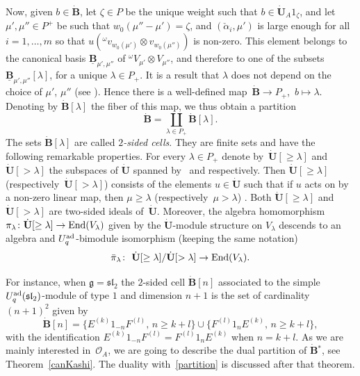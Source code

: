 \documentclass[10pt,a4paper]{amsart}
\numberwithin{equation}{section}
\theoremstyle{definition}
\newcommand{\Oo}{{\mathcal O}}
\newcommand{\ra}{\rightarrow}
\begin{document}
Now, given $b\in \dot{\mathbf{B}}$, let $\zeta\in P$ be the unique weight such that $b \in \dot{\mathbf{U}}_A 1_\zeta$, and let ${\mu', \mu''\in P^+}$ be such that $w_0(\mu''-\mu')=\zeta$, and $(\check{\alpha}_i,\mu')$ is large enough for all $i=1,\dots,m$ so that $u({}^\omega v_{w_0(\mu')}\otimes v_{w_0(\mu'')})$ is non-zero. This element belongs to the canonical basis $\underline{\mathbf{B}}_{\mu',\mu''}$ of ${}^{\omega}V_{\mu'}\otimes V_{\mu''}$, and therefore to one of the subsets $\underline{\mathbf{B}}_{\mu',\mu''}[\lambda]$, for a unique $\lambda\in P_+$. It is a result that $\lambda$ does not depend on the choice of $\mu'$, $\mu''$ (see \cite[Section~29.1.1]{Lusztig}). Hence there is a well-defined map~${\dot{\mathbf{B}}\ra P_+}$,~$b\mapsto \lambda$. Denoting by $\dot{\mathbf{B}} [\lambda]$ the fiber of this map, we thus obtain a partition
\begin{equation}\label{partition} \dot{\mathbf{B}} = \coprod_{\lambda\in P_+}\dot{\mathbf{B}} [\lambda]. \end{equation}
The sets $\dot{\mathbf{B}} [\lambda]$ are called {\it $2$-sided cells}. They are finite sets and have the following remarkable properties. For every $\lambda\in P_+$ denote by~${\dot{\mathbf{U}} [\geq \lambda]}$ and $\dot{\mathbf{U}} [> \lambda]$ the subspaces of $\dot{\mathbf{U}}$ spanned by~ and  respectively. Then $\dot{\mathbf{U}} [\geq \lambda]$ (respectively~${\dot{\mathbf{U}} [> \lambda]}$) consists of the elements $u\in \dot{\mathbf{U}}$ such that if $u$ acts on  by a non-zero linear map, then $\mu\geq \lambda$ (respectively~${\mu> \lambda}$) \cite[Lemmas~29.1.3 and~29.1.4]{Lusztig}. Both $\dot{\mathbf{U}} [\geq \lambda]$ and $\dot{\mathbf{U}} [> \lambda]$ are two-sided ideals of~$\dot{\mathbf{U}}$. Moreover, the algebra homomorphism $\pi_\lambda\colon \dot{\mathbf{U}} [\geq\lambda] \ra {\rm End}(V_\lambda)$ given by the $\dot{\mathbf{U}}$-module structure on $V_\lambda$ descends to an algebra and $U_q^{\rm ad}$-bimodule isomorphism (keeping the same notation) \cite[Proposition~29.2.2]{Lusztig}
\begin{equation}\label{pimuiso} \bar{\pi}_\lambda\colon\ \dot{\mathbf{U}} [\geq \lambda]/ \dot{\mathbf{U}} [> \lambda] \ra {\rm End}(V_\lambda) . \end{equation}

For instance, when $\mathfrak{g}={\mathfrak{sl}_2}$ the $2$-sided cell $\dot{\mathbf{B}} [n]$ associated to the simple $U_q^{\rm ad}({\mathfrak{sl}_2})$-module of type $1$ and dimension $n+1$ is the set of cardinality $(n+1)^2$ given by \cite[Section~29.4.3]{Lusztig}
\begin{equation}\label{2sidedcellsl2}
\dot{\mathbf{B}} [n] =\big\{E^{(k)}1_{-n}F^{(l)},\,n\geq k+l \big\} \cup \big\{F^{(l)}1_nE^{(k)},\,n\geq k+l\big\},
\end{equation}
with the identification $E^{(k)}1_{-n}F^{(l)} = F^{(l)}1_nE^{(k)}$ when $n=k+l$. As we are mainly interested in~$\Oo_A$, we are going to describe the dual partition of $\dot{\mathbf{B}} {}^*$, see Theorem~\ref{canKashi}. The duality with~\eqref{partition} is discussed after that theorem.
\end{document}
